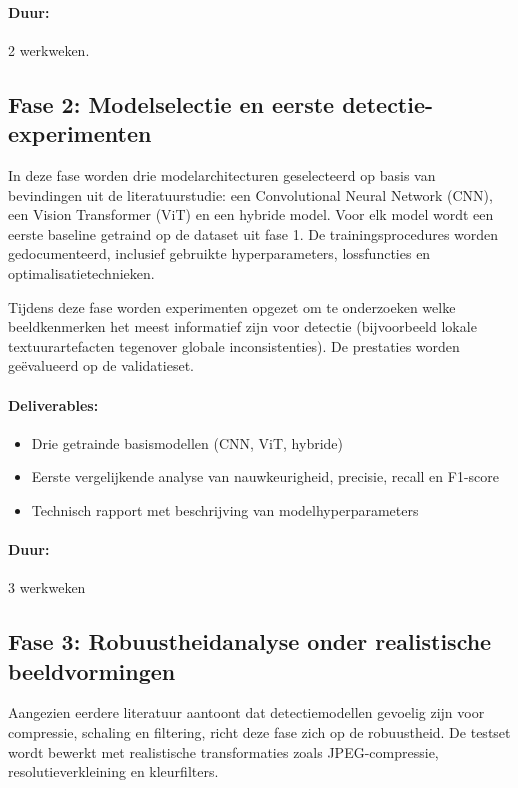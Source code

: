 \documentclass{hogent-article}
\begin{document}
\paragraph{Duur:} 2 werkweken.

\subsection{Fase 2: Modelselectie en eerste detectie-experimenten}

In deze fase worden drie modelarchitecturen geselecteerd op basis van bevindingen uit de literatuurstudie: een Convolutional Neural Network (CNN), een Vision Transformer (ViT) en een hybride model. Voor elk model wordt een eerste baseline getraind op de dataset uit fase 1. De trainingsprocedures worden gedocumenteerd, inclusief gebruikte hyperparameters, lossfuncties en optimalisatietechnieken.

Tijdens deze fase worden experimenten opgezet om te onderzoeken welke beeldkenmerken het meest informatief zijn voor detectie (bijvoorbeeld lokale textuurartefacten tegenover globale inconsistenties). De prestaties worden geëvalueerd op de validatieset.

\paragraph{Deliverables:}

\begin{itemize}
    \item Drie getrainde basismodellen (CNN, ViT, hybride)
    \item Eerste vergelijkende analyse van nauwkeurigheid, precisie, recall en F1-score
    \item Technisch rapport met beschrijving van modelhyperparameters
\end{itemize}

\paragraph{Duur:} 3 werkweken

\subsection{Fase 3: Robuustheidanalyse onder realistische beeldvormingen}

Aangezien eerdere literatuur aantoont dat detectiemodellen gevoelig zijn voor compressie, schaling en filtering, richt deze fase zich op de robuustheid. De testset wordt bewerkt met realistische transformaties zoals JPEG-compressie, resolutieverkleining en kleurfilters.
\end{document}
